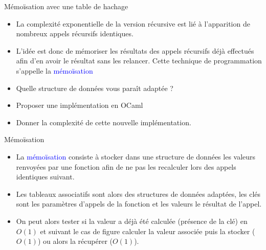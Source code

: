 \documentclass[10pt]{beamer}
\begin{document}
\begin{frame}{\Ctitle}{\stitle}
	\begin{block}{Mémoïsation avec une table de hachage}
		\begin{itemize}
	\item<1-> La complexité exponentielle de la version récursive est lié à l'apparition de nombreux appels récursifs identiques. 
	\item<2-> L'idée est donc de mémoriser les résultats des appels récursifs déjà effectués afin d'en avoir le résultat sans les relancer. Cette technique de programmation s'appelle la \textcolor{blue}{mémoïsation}
	\item<3-> Quelle structure de données vous paraît adaptée ?
	\item<4-> Proposer une implémentation en OCaml
	\item<5-> Donner la complexité de cette nouvelle implémentation.
		\end{itemize}
	\end{block}
\end{frame}

\begin{frame}{\Ctitle}{\stitle}
	\begin{alertblock}{Mémoïsation}
		\begin{itemize}
			\item<1-> La \textcolor{blue}{mémoïsation} consiste à stocker dans une structure de données les valeurs renvoyées par une fonction afin de ne pas les recalculer lors des appels identiques suivant.\\
			\item<2-> Les tableaux associatifs sont alors des structures de données adaptées, les clés sont les paramètres d'appels de la fonction et les valeurs le résultat de l'appel.
			\item<3-> On peut alors tester si la valeur a déjà été calculée (présence de la clé) en $O(1)$ et suivant le cas de figure calculer la valeur associée puis la stocker ($O(1)$) ou alors la récupérer ($O(1)$).
		\end{itemize}
	\end{alertblock}
\end{frame}
\end{document}
